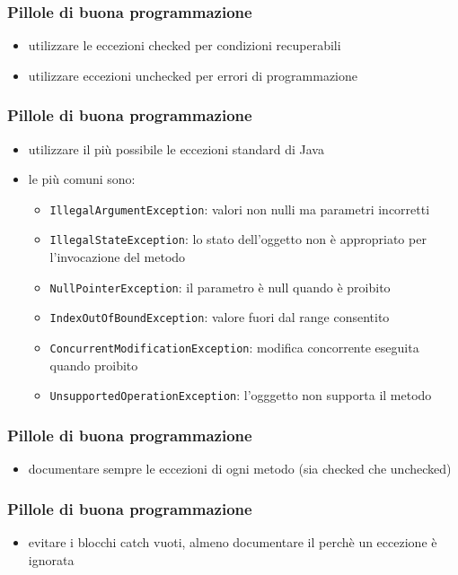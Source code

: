 \documentclass{beamer}
\begin{document}
\begin{frame}[fragile]
\frametitle{Pillole di buona programmazione}
\begin{itemize}
\item utilizzare le eccezioni checked per condizioni recuperabili 
\item utilizzare eccezioni unchecked per errori di programmazione
\end{itemize}
\end{frame}

\begin{frame}[fragile]
\frametitle{Pillole di buona programmazione}
\begin{itemize}
\item utilizzare il pi\`u possibile le eccezioni standard di Java
\item le pi\`u comuni sono:
\begin{itemize}
\item \texttt{IllegalArgumentException}: valori non nulli ma parametri incorretti
\item \texttt{IllegalStateException}: lo stato dell'oggetto non \`e appropriato per l'invocazione del metodo 
\item \texttt{NullPointerException}: il parametro \`e null quando \`e proibito
\item \texttt{IndexOutOfBoundException}: valore fuori dal range consentito
\item \texttt{ConcurrentModificationException}: modifica concorrente eseguita quando proibito
\item \texttt{UnsupportedOperationException}: l'ogggetto non supporta il metodo
\end{itemize}
\end{itemize}
\end{frame}

\begin{frame}[fragile]
\frametitle{Pillole di buona programmazione}
\begin{itemize}
\item  documentare sempre le eccezioni di ogni metodo (sia checked che unchecked)
 \end{itemize}
\end{frame}


\begin{frame}[fragile]
\frametitle{Pillole di buona programmazione}
\begin{itemize}
\item  evitare i blocchi catch vuoti, almeno documentare il perch\`e un eccezione \`e ignorata
 \end{itemize}
\end{frame}
\end{document}

